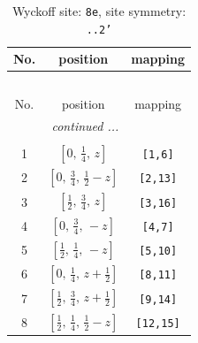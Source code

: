 \documentclass[fleqn,8pt]{jsarticle}
\begin{document}
\begin{longtable}{ccc}
\caption{Wyckoff site: {\tt 8e}, site symmetry: {\tt ..2'}}
 \\
 \hline \hline
No. & position & mapping \\ \hline \endfirsthead

\multicolumn{2}{l}{\tablename\ \thetable{}} \\
 \hline \hline
No. & position & mapping \\ \hline \endhead

 \hline \hline
\multicolumn{2}{r}{\footnotesize\it continued ...} \\ \endfoot

 \hline \hline
\multicolumn{2}{r}{} \\ \endlastfoot

1 & $\left[ 0,\, \frac{1}{4},\, z \right]$ & {\tt [1,6]} \\ \hline
2 & $\left[ 0,\, \frac{3}{4},\, \frac{1}{2} - z \right]$ & {\tt [2,13]} \\ \hline
3 & $\left[ \frac{1}{2},\, \frac{3}{4},\, z \right]$ & {\tt [3,16]} \\ \hline
4 & $\left[ 0,\, \frac{3}{4},\, - z \right]$ & {\tt [4,7]} \\ \hline
5 & $\left[ \frac{1}{2},\, \frac{1}{4},\, - z \right]$ & {\tt [5,10]} \\ \hline
6 & $\left[ 0,\, \frac{1}{4},\, z + \frac{1}{2} \right]$ & {\tt [8,11]} \\ \hline
7 & $\left[ \frac{1}{2},\, \frac{3}{4},\, z + \frac{1}{2} \right]$ & {\tt [9,14]} \\ \hline
8 & $\left[ \frac{1}{2},\, \frac{1}{4},\, \frac{1}{2} - z \right]$ & {\tt [12,15]} \\
\end{longtable}
\renewcommand{\arraystretch}{1.2}
\end{document}
